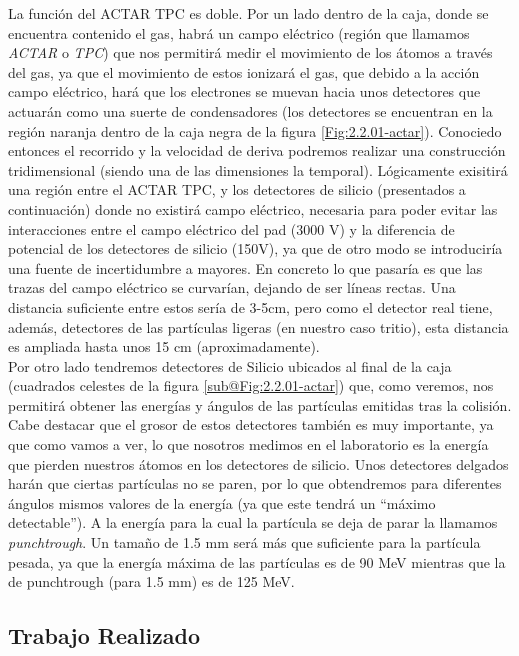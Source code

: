 \documentclass[12pt,a4paper]{article}
\numberwithin{equation}{section}
\numberwithin{figure}{section}
\begin{document}
La función del ACTAR TPC es doble. Por un lado dentro de la caja, donde se encuentra contenido el gas, habrá un campo eléctrico (región que llamamos {\it ACTAR} o {\it TPC}) que nos permitirá medir el movimiento de los átomos a través del gas, ya que  el movimiento de estos ionizará el gas, que debido a la acción campo eléctrico, hará que los electrones se muevan  hacia unos detectores que actuarán como una suerte de condensadores (los detectores se encuentran en la región naranja dentro de la caja negra de la figura \ref{Fig:2.2.01-actar}). Conociedo entonces el recorrido y la velocidad de deriva podremos realizar una construcción tridimensional (siendo una de las dimensiones la temporal). Lógicamente exisitirá una región entre el ACTAR TPC, y los detectores de silicio (presentados a continuación) donde no existirá campo eléctrico, necesaria para poder evitar las interacciones entre el campo eléctrico del pad (3000 V) y la diferencia de potencial de los detectores de silicio (150V), ya que de otro modo se introduciría una fuente de incertidumbre a mayores. En concreto lo que pasaría es que las trazas del campo eléctrico se curvarían, dejando de ser líneas rectas. Una distancia suficiente entre estos sería de 3-5cm, pero como el detector real tiene, además, detectores de las partículas ligeras (en nuestro caso tritio), esta distancia es ampliada hasta unos 15 cm (aproximadamente).  \\

Por otro lado tendremos detectores de Silicio ubicados al final de la caja (cuadrados celestes de la figura \ref{sub@Fig:2.2.01-actar}) que, como veremos, nos permitirá obtener las energías y ángulos de las partículas emitidas tras la colisión. Cabe destacar que el grosor de estos detectores también es muy importante, ya que como vamos a ver, lo que nosotros medimos en el laboratorio es la energía que pierden nuestros átomos en los detectores de silicio. Unos detectores delgados harán que ciertas partículas no se paren, por lo que obtendremos para diferentes ángulos mismos valores de la energía (ya que este tendrá un ``máximo detectable''). A la energía para la cual la partícula se deja de parar la llamamos {\it punchtrough}. Un tamaño de 1.5 mm será más que suficiente para la partícula pesada, ya que la energía máxima de las partículas es de 90 MeV mientras que la de punchtrough (para 1.5 mm) es de 125 MeV.  


\subsection{Trabajo Realizado}
\end{document}
